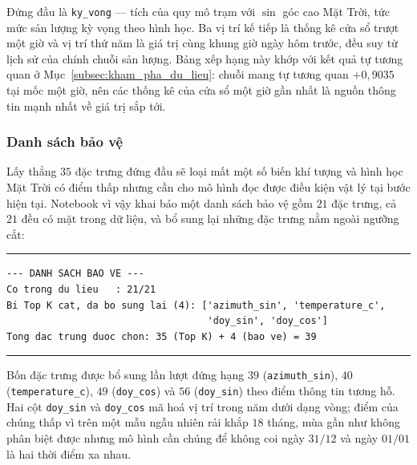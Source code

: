 \documentclass[12pt, a4paper]{report}
\begin{document}
Đứng đầu là \texttt{ky\_vong} --- tích của quy mô trạm với $\sin$ góc cao Mặt Trời, tức mức
sản lượng kỳ vọng theo hình học. Ba vị trí kế tiếp là thống kê cửa sổ trượt một giờ và vị trí
thứ năm là giá trị cùng khung giờ ngày hôm trước, đều suy từ lịch sử của chính chuỗi sản lượng. Bảng xếp hạng này khớp với kết quả tự tương quan ở Mục~\ref{subsec:kham_pha_du_lieu}: chuỗi mang
tự tương quan $+0{,}9035$ tại mốc một giờ, nên các thống kê của cửa sổ một giờ gần nhất là nguồn
thông tin mạnh nhất về giá trị sắp tới.

\subsubsection{Danh sách bảo vệ}

Lấy thẳng $35$ đặc trưng đứng đầu sẽ loại mất một số biến khí tượng và hình học Mặt Trời có điểm
thấp nhưng cần cho mô hình đọc được điều kiện vật lý tại bước hiện tại. Notebook vì vậy khai báo
một danh sách bảo vệ gồm $21$ đặc trưng, cả $21$ đều có mặt trong dữ liệu, và bổ sung lại những
đặc trưng nằm ngoài ngưỡng cắt:

\begingroup
\par\vspace{6pt}\hrule\vspace{4pt}
\footnotesize\renewcommand{\baselinestretch}{1.0}\selectfont
\begin{verbatim}
--- DANH SACH BAO VE ---
Co trong du lieu   : 21/21
Bi Top K cat, da bo sung lai (4): ['azimuth_sin', 'temperature_c',
                                   'doy_sin', 'doy_cos']
Tong dac trung duoc chon: 35 (Top K) + 4 (bao ve) = 39
\end{verbatim}
\vspace{2pt}\hrule\par\vspace{6pt}
\endgroup

Bốn đặc trưng được bổ sung lần lượt đứng hạng $39$ (\texttt{azimuth\_sin}), $40$
(\texttt{temperature\_c}), $49$ (\texttt{doy\_cos}) và $56$ (\texttt{doy\_sin}) theo điểm thông tin tương
hỗ. Hai cột \texttt{doy\_sin} và \texttt{doy\_cos} mã hoá vị trí trong năm dưới dạng vòng; điểm của
chúng thấp vì trên một mẫu ngẫu nhiên rải khắp $18$ tháng, mùa gần như không phân biệt được 
nhưng mô hình cần chúng để không coi ngày $31/12$ và ngày $01/01$ là hai thời điểm xa nhau.
\end{document}
